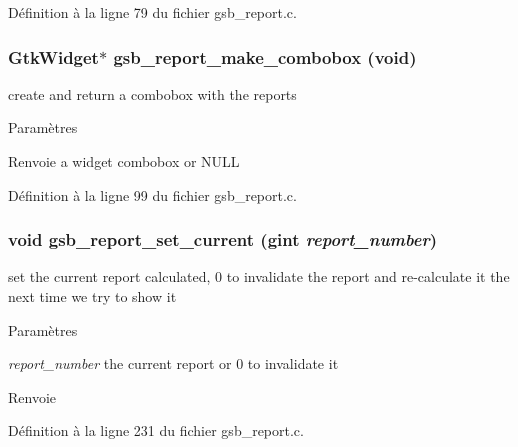 Définition à la ligne 79 du fichier gsb\_\-report.c.

\subsubsection[{gsb\_\-report\_\-make\_\-combobox}]{\setlength{\rightskip}{0pt plus 5cm}GtkWidget$\ast$ gsb\_\-report\_\-make\_\-combobox (void)}\label{gsb__report_8c_af2e1bf81ec2ee8448a590dd793bc1e9f}
create and return a combobox with the reports


\begin{DoxyParams}{Paramètres}
\item[{\em }]\end{DoxyParams}
\begin{DoxyReturn}{Renvoie}
a widget combobox or NULL 
\end{DoxyReturn}


Définition à la ligne 99 du fichier gsb\_\-report.c.

\subsubsection[{gsb\_\-report\_\-set\_\-current}]{\setlength{\rightskip}{0pt plus 5cm}void gsb\_\-report\_\-set\_\-current (gint {\em report\_\-number})}\label{gsb__report_8c_a51d50ccf9e1c9ddeb43b0bb61a5af19e}
set the current report calculated, 0 to invalidate the report and re-\/calculate it the next time we try to show it


\begin{DoxyParams}{Paramètres}
\item[{\em report\_\-number}]the current report or 0 to invalidate it\end{DoxyParams}
\begin{DoxyReturn}{Renvoie}

\end{DoxyReturn}


Définition à la ligne 231 du fichier gsb\_\-report.c.

